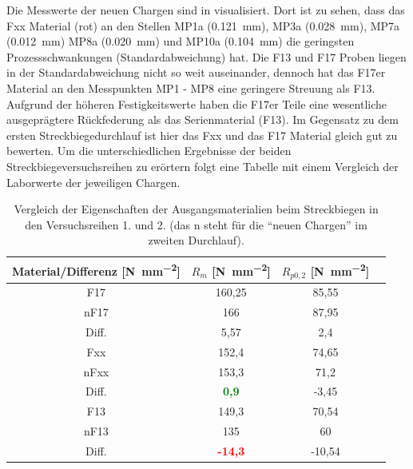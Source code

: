 \documentclass[12pt,a4paper,parskip,twoside,BCOR5mm,headsepline]{scrartcl}
\begin{document}
Die Messwerte der neuen Chargen sind in  visualisiert. Dort ist zu sehen, dass das Fxx Material (rot) an den Stellen MP1a (\SI{0,121}{\milli\meter}), MP3a (\SI{0,028}{\milli\metre}),  MP7a (\SI{0,012}{\milli\meter}) MP8a (\SI{0,020}{\milli\meter}) und MP10a (\SI{0,104}{\milli\meter}) die geringsten Prozessschwankungen (Standardabweichung) hat.  Die F13 und F17 Proben liegen in der Standardabweichung nicht so weit auseinander, dennoch hat das F17er Material an den Messpunkten MP1 - MP8 eine geringere Streuung als F13. Aufgrund der höheren Festigkeitswerte haben die F17er Teile eine wesentliche ausgeprägtere Rückfederung als das Serienmaterial (F13). Im Gegensatz zu dem ersten Streckbiegedurchlauf ist hier das Fxx und das F17 Material gleich gut zu bewerten. Um die unterschiedlichen Ergebnisse der beiden Streckbiegeversuchsreihen zu erörtern folgt eine Tabelle mit einem Vergleich der Laborwerte der jeweiligen Chargen. 

\begin{table}[H]
\caption{Vergleich der Eigenschaften der  Ausgangsmaterialien beim Streckbiegen in den Versuchsreihen 1. und 2. (das n steht für die "`neuen Chargen"' im zweiten Durchlauf).}
\label{tab:altneu}
\centering
\begin{tabular}{cccc}
\toprule
Material/Differenz [\si{\newton\per\milli\meter\squared}] & $R_m$ [\si{\newton\per\milli\meter\squared}]& $R_{p0,2}$ [\si{\newton\per\milli\meter\squared}] \\
\midrule
F17 & 160,25 & 85,55 \\
nF17 & 166 & 87,95 \\
Diff. & 5,57 & 2,4 \\
\midrule
Fxx & 152,4 & 74,65 \\
nFxx & 153,3 & 71,2 \\
Diff. & \textbf{\textcolor{green}{0,9}} & -3,45 \\
\midrule
F13 & 149,3 & 70,54 \\
nF13 & 135 & 60 \\
Diff. & \textbf{\textcolor{red}{-14,3}} & -10,54 \\
\bottomrule
\end{tabular}
\end{table}
\end{document}
